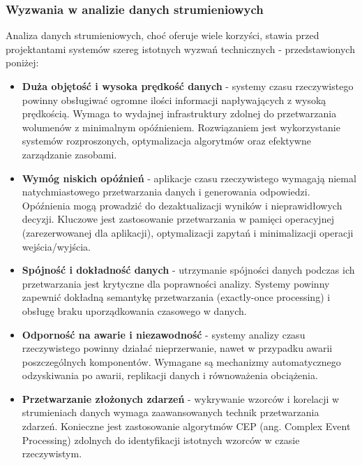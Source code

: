 \subsubsection{Wyzwania w analizie danych strumieniowych}
\label{subsubsec:wyzwania_analizy_rt}

Analiza danych strumieniowych, choć oferuje wiele korzyści, stawia przed projektantami systemów szereg istotnych wyzwań technicznych - przedstawionych poniżej:

\begin{itemize}
    \item \textbf{Duża objętość i wysoka prędkość danych} - systemy czasu rzeczywistego powinny obsługiwać ogromne ilości informacji napływających z wysoką prędkością. Wymaga to wydajnej infrastruktury zdolnej do przetwarzania wolumenów z minimalnym opóźnieniem. Rozwiązaniem jest wykorzystanie systemów rozproszonych, optymalizacja algorytmów oraz efektywne zarządzanie zasobami.
    
    \item \textbf{Wymóg niskich opóźnień} - aplikacje czasu rzeczywistego wymagają niemal natychmiastowego przetwarzania danych i generowania odpowiedzi. Opóźnienia mogą prowadzić do dezaktualizacji wyników i nieprawidłowych decyzji. Kluczowe jest zastosowanie przetwarzania w pamięci operacyjnej (zarezerwowanej dla aplikacji), optymalizacji zapytań i minimalizacji operacji wejścia/wyjścia.
    
    \item \textbf{Spójność i dokładność danych} - utrzymanie spójności danych podczas ich przetwarzania jest krytyczne dla poprawności analizy. Systemy powinny zapewnić dokładną semantykę przetwarzania (exactly-once processing) i obsługę braku uporządkowania czasowego w danych.
    
    \newpage

    \item \textbf{Odporność na awarie i niezawodność} - systemy analizy czasu rzeczywistego powinny działać nieprzerwanie, nawet w przypadku awarii poszczególnych komponentów. Wymagane są mechanizmy automatycznego odzyskiwania po awarii, replikacji danych i równoważenia obciążenia.
    
    \item \textbf{Przetwarzanie złożonych zdarzeń} - wykrywanie wzorców i korelacji w strumieniach danych wymaga zaawansowanych technik przetwarzania zdarzeń. Konieczne jest zastosowanie algorytmów CEP (ang. Complex Event Processing) zdolnych do identyfikacji istotnych wzorców w czasie rzeczywistym.
    

\end{itemize}
